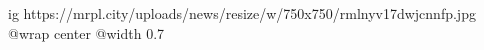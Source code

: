  
 
 
 
 

\ifcmt
  ig https://mrpl.city/uploads/news/resize/w/750x750/rmlnyv17dwjcnnfp.jpg
  @wrap center
  @width 0.7
\fi

